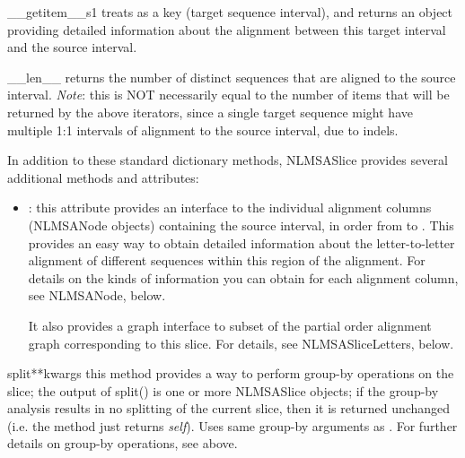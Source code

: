 \documentclass{howto}
\begin{document}
\begin{funcdesc}{__getitem__}{s1}
  treats  as a key (target sequence
  interval), and returns an  object providing detailed
  information about the alignment between this target interval
  and the source interval.
\end{funcdesc}


\begin{funcdesc}{__len__}{}
  returns the number of distinct sequences that
  are aligned to the source interval.  {\em Note}: this is NOT necessarily 
  equal to the number of items that will be returned by the above iterators,
  since a single target sequence might have multiple 1:1 intervals of
  alignment to the source interval, due to indels.
\end{funcdesc}



In addition to these standard dictionary methods, NLMSASlice provides
several additional methods and attributes:


\begin{itemize}
\item
{}: this attribute provides an interface to 
the individual alignment columns (NLMSANode objects) containing the
source interval, in order from  to .  This provides
an easy way to obtain detailed information about the letter-to-letter
alignment of different sequences within this region of the alignment.
For details on the kinds of information you can obtain for each
alignment column, see NLMSANode, below.

It also provides a graph interface to subset of the partial order alignment 
graph corresponding to this slice.  For details, see NLMSASliceLetters, below.
\end{itemize}

\begin{funcdesc}{split}{**kwargs}
  this method provides a way to perform group-by operations on the slice;
  the output of split() is one or more NLMSASlice objects; if the
  group-by analysis results in no splitting of the current slice, then
  it is returned unchanged (i.e. the method just returns {\em self}).
  Uses same group-by arguments as .
  For further details on group-by operations, see  above.
\end{funcdesc}
\end{document}
